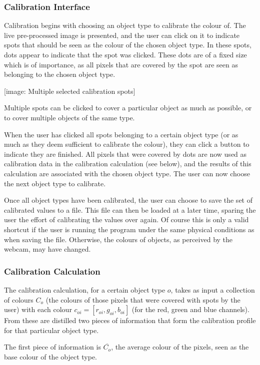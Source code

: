 \documentclass[10pt,twocolumn]{article}
\begin{document}
\subsubsection{Calibration Interface}
Calibration begins with choosing an object type to calibrate the colour of. The live pre-processed image is presented, and the user can click on it to indicate spots that should be seen as the colour of the chosen object type. In these spots, dots appear to indicate that the spot was clicked. These dots are of a fixed size which is of importance, as all pixels that are covered by the spot are seen as belonging to the chosen object type.

[image: Multiple selected calibration spots]

Multiple spots can be clicked to cover a particular object as much as possible, or to cover multiple objects of the same type.

When the user has clicked all spots belonging to a certain object type (or as much as they deem sufficient to calibrate the colour), they can click a button to indicate they are finished. All pixels that were covered by dots are now used as calibration data in the calibration calculation (see below), and the results of this calculation are associated with the chosen object type. The user can now choose the next object type to calibrate.

Once all object types have been calibrated, the user can choose to save the set of calibrated values to a file. This file can then be loaded at a later time, sparing the user the effort of calibrating the values over again. Of course this is only a valid shortcut if the user is running the program under the same physical conditions as when saving the file. Otherwise, the colours of objects, as perceived by the webcam, may have changed.

\subsubsection{Calibration Calculation}

The calibration calculation, for a certain object type $o$, takes as input a collection of colours $C_o$ (the colours of those pixels that were covered with spots by the user) with each colour $c_{oi} = [r_{oi},g_{oi},b_{oi}]$ (for the red, green and blue channels). From these are distilled two pieces of information that form the calibration profile for that particular object type.

The first piece of information is $\overline{C_o}$, the average colour of the pixels, seen as the base colour of the object type.
 
\end{document}
